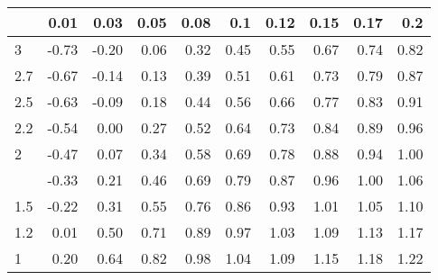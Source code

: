 
\begin{tabular}{lrrrrrrrrr}
\toprule
  & 0.01 & 0.03 & 0.05 & 0.08 & 0.1 & 0.12 & 0.15 & 0.17 & 0.2\\
\midrule
3 & -0.73 & -0.20 & 0.06 & 0.32 & 0.45 & 0.55 & 0.67 & 0.74 & 0.82\\
2.7 & -0.67 & -0.14 & 0.13 & 0.39 & 0.51 & 0.61 & 0.73 & 0.79 & 0.87\\
2.5 & -0.63 & -0.09 & 0.18 & 0.44 & 0.56 & 0.66 & 0.77 & 0.83 & 0.91\\
2.2 & -0.54 & 0.00 & 0.27 & 0.52 & 0.64 & 0.73 & 0.84 & 0.89 & 0.96\\
2 & -0.47 & 0.07 & 0.34 & 0.58 & 0.69 & 0.78 & 0.88 & 0.94 & 1.00\\
\addlinespace
1.7 & -0.33 & 0.21 & 0.46 & 0.69 & 0.79 & 0.87 & 0.96 & 1.00 & 1.06\\
1.5 & -0.22 & 0.31 & 0.55 & 0.76 & 0.86 & 0.93 & 1.01 & 1.05 & 1.10\\
1.2 & 0.01 & 0.50 & 0.71 & 0.89 & 0.97 & 1.03 & 1.09 & 1.13 & 1.17\\
1 & 0.20 & 0.64 & 0.82 & 0.98 & 1.04 & 1.09 & 1.15 & 1.18 & 1.22\\
\bottomrule
\end{tabular}
